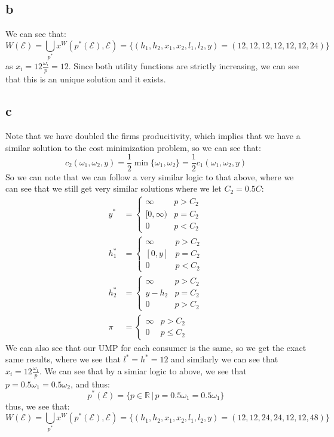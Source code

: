 \documentclass[11pt]{article}
\newcommand{\R}{\mathbb{R}}
\begin{document}
\subsection*{b}
We can see that:
\[
    W(\mathcal{E}) = \bigcup_{p^*} x^W(p^*(\mathcal{E}), \mathcal{E}) = \{(h_1, h_2, x_1, x_2, l_1, l_2, y) = (12,12,12,12,12, 12 ,24)\}
\]
as $x_i = 12\frac{\omega_i}{p} = 12$. Since both utility functions are strictly increasing, we can see that this is an unique solution and it exists. 
\subsection*{c}
Note that we have doubled the firms producitivity, which implies that we have a similar solution to the cost minimization problem, so we can see that:
\[
c_2(\omega_1, \omega_2, y) = \frac{1}{2}\min \{ \omega_1, \omega_2\} = \frac{1}{2}c_1(\omega_1, \omega_2, y)
\]
So we can note that we can follow a very similar logic to that above, where we can see that we still  get very similar solutions where we let $C_2 = 0.5C$:
\begin{align*}
    y^* &= \begin{cases}
        \infty & p > C_2\\
        [0,\infty) & p = C_2\\
        0 & p < C_2
    \end{cases}\\
    h_1^* &= \begin{cases}
        \infty & p>C_2\\
        [0, y] & p = C_2\\
        0 & p < C_2
    \end{cases}\\
    h_2^* &= \begin{cases}
        \infty & p > C_2\\
        y - h_2 & p = C_2\\
        0 & p > C_2
    \end{cases}\\
    \pi &= \begin{cases}
        \infty & p > C_2\\
        0 & p \leq C_2
    \end{cases}
\end{align*}
We can also see that our UMP for each consumer is the same, so we get the exact same results, where we see that $l^* = h^* = 12$ and similarly we can see that $x_i = 12\frac{\omega_1}{p}$. We can see that by a simiar logic to above, we see that $p = 0.5\omega_1 = 0.5\omega_2$, and thus:
\[
p^*(\mathcal{E}) = \{ p \in \R \hspace{2pt} | \hspace{2pt} p = 0.5\omega_1 = 0.5\omega_1\}
\]
thus, we see that:
\[
W(\mathcal{E}) = \bigcup_{p^*} x^W(p^*(\mathcal{E}), \mathcal{E}) = \{(h_1, h_2, x_1, x_2, l_1, l_2, y) = (12,12,24,24,12, 12 ,48)\}
\]
\end{document}
